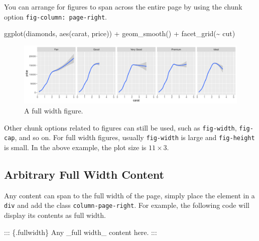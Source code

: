 \documentclass[
  letterpaper,
  DIV=11,
  numbers=noendperiod,
  oneside]{scrartcl}
\newenvironment{Shaded}{\begin{snugshade}}{\end{snugshade}}
\newcommand{\FunctionTok}[1]{\textcolor[rgb]{0.28,0.35,0.67}{#1}}
\newcommand{\NormalTok}[1]{\textcolor[rgb]{0.00,0.23,0.31}{#1}}
\newcommand{\SpecialCharTok}[1]{\textcolor[rgb]{0.37,0.37,0.37}{#1}}
\begin{document}
You can arrange for figures to span across the entire page by using the
chunk option \texttt{fig-column:\ page-right}.

\begin{Shaded}
\begin{Highlighting}[]
\FunctionTok{ggplot}\NormalTok{(diamonds, }\FunctionTok{aes}\NormalTok{(carat, price)) }\SpecialCharTok{+} \FunctionTok{geom\_smooth}\NormalTok{() }\SpecialCharTok{+}
  \FunctionTok{facet\_grid}\NormalTok{(}\SpecialCharTok{\textasciitilde{}}\NormalTok{ cut)}
\end{Highlighting}
\end{Shaded}

\begin{figure}[H]

{\centering \includegraphics{cv_files/figure-pdf/fig-fullwidth-1.pdf}

}

\caption{\label{fig-fullwidth}A full width figure.}

\end{figure}

Other chunk options related to figures can still be used, such as
\texttt{fig-width}, \texttt{fig-cap}, and so on. For full width figures,
usually \texttt{fig-width} is large and \texttt{fig-height} is small. In
the above example, the plot size is \(11 \times 3\).

\hypertarget{arbitrary-full-width-content}{%
\subsection{Arbitrary Full Width
Content}\label{arbitrary-full-width-content}}

Any content can span to the full width of the page, simply place the
element in a \texttt{div} and add the class \texttt{column-page-right}.
For example, the following code will display its contents as full width.

\begin{Shaded}
\begin{Highlighting}[]
\NormalTok{::: \{.fullwidth\}}
\NormalTok{Any \_full width\_ content here.}
\NormalTok{:::}
\end{Highlighting}
\end{Shaded}
\end{document}
